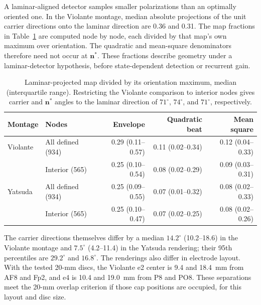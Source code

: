 A laminar-aligned detector samples smaller polarizations than an optimally
oriented one. In the Violante montage, median absolute projections of the
unit carrier directions onto the laminar direction are 0.36 and 0.31.
The map fractions in Table~\ref{tab:fem-laminar-fractions} are computed
node by node, each divided by that map's own maximum over orientation.
The quadratic and mean-square denominators therefore need not occur at
$\mathbf n^*$. These fractions describe geometry under a laminar-detector
hypothesis, before state-dependent detection or recurrent gain.

\begin{table}[htbp]
\centering\small
\begin{tabular}{@{}llrrr@{}}
\toprule
Montage & Nodes & Envelope & Quadratic beat & Mean square\\
\midrule
Violante & All defined (934) & 0.29 (0.11--0.57) & 0.11 (0.02--0.34) & 0.12 (0.04--0.33)\\
 & Interior (565) & 0.25 (0.10--0.54) & 0.08 (0.02--0.29) & 0.09 (0.03--0.31)\\
Yatsuda & All defined (934) & 0.25 (0.09--0.55) & 0.07 (0.01--0.32) & 0.08 (0.02--0.33)\\
 & Interior (565) & 0.25 (0.10--0.47) & 0.07 (0.02--0.25) & 0.08 (0.02--0.26)\\
\bottomrule
\end{tabular}
\caption{Laminar-projected map divided by its orientation maximum, median
(interquartile range). Restricting the Violante comparison to interior nodes
gives carrier and $\mathbf n^*$ angles to the laminar direction of
$71^\circ$, $74^\circ$, and $71^\circ$, respectively.}
\label{tab:fem-laminar-fractions}
\end{table}

The carrier directions themselves differ by a median $14.2^\circ$ (10.2--18.6) in the Violante montage and $7.5^\circ$ (4.2--11.4) in the Yatsuda rendering; their 95th percentiles are $29.2^\circ$ and $16.8^\circ$. The renderings also differ in electrode layout. With the tested 20-mm discs, the Violante e2 center is 9.4 and 18.4~mm from AF8 and Fp2, and e4 is 10.4 and 19.0~mm from P8 and PO8. These separations meet the 20-mm overlap criterion if those cap positions are occupied, for this layout and disc size.
